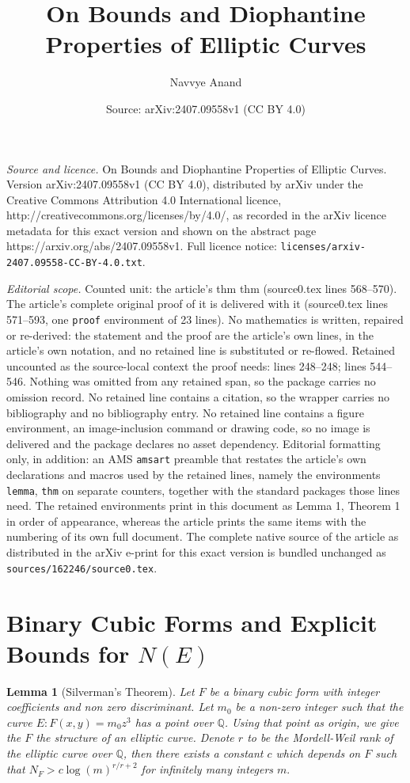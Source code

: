\documentclass[10pt,a4paper]{amsart}
\title{On Bounds and Diophantine Properties of Elliptic Curves}
\author{Navvye Anand}
\date{Source: arXiv:2407.09558v1 (CC BY 4.0)}
\newtheorem{lemma}{Lemma}
\begin{document}
\maketitle

\noindent\emph{Source and licence.} On Bounds and Diophantine Properties of Elliptic Curves. Version arXiv:2407.09558v1 (CC BY 4.0), distributed by arXiv under the Creative Commons Attribution 4.0 International licence, http://creativecommons.org/licenses/by/4.0/, as recorded in the arXiv licence metadata for this exact version and shown on the abstract page https://arxiv.org/abs/2407.09558v1. Full licence notice: \texttt{licenses/arxiv-2407.09558-CC-BY-4.0.txt}.\par\smallskip

\noindent\textit{Editorial scope.} Counted unit: the article's thm thm (source0.tex lines 568--570). The article's complete original proof of it is delivered with it (source0.tex lines 571--593, one \texttt{proof} environment of 23 lines). No mathematics is written, repaired or re-derived: the statement and the proof are the article's own lines, in the article's own notation, and no retained line is substituted or re-flowed.  Retained uncounted as the source-local context the proof needs: lines 248--248; lines 544--546.  Nothing was omitted from any retained span, so the package carries no omission record.  No retained line contains a citation, so the wrapper carries no bibliography and no bibliography entry.  No retained line contains a figure environment, an image-inclusion command or drawing code, so no image is delivered and the package declares no asset dependency.  Editorial formatting only, in addition: an AMS \texttt{amsart} preamble that restates the article's own declarations and macros used by the retained lines, namely the environments \texttt{lemma}, \texttt{thm} on separate counters, together with the standard packages those lines need.  The retained environments print in this document as Lemma 1, Theorem 1 in order of appearance, whereas the article prints the same items with the numbering of its own full document.  The complete native source of the article as distributed in the arXiv e-print for this exact version is bundled unchanged as \texttt{sources/162246/source0.tex}.
\section{Binary Cubic Forms and Explicit Bounds for $N(E)$} \label{BinaryCubic}

\begin{lemma}[{Silverman's Theorem}]\label{Silverman's Theorem}
    Let $F$ be a binary cubic form with integer coefficients and non zero discriminant. Let $m_0 $ be a non-zero integer such that the curve $E : F(x,y) = m_0 z^3$ has a point over $\mathbb{Q}$. Using that point as origin, we give the $F$ the structure of an elliptic curve. Denote $r$ to be the Mordell-Weil rank of the elliptic curve over $\mathbb{Q}$, then there exists a constant $c$ which depends on $F$ such that $N_{F} > c \log{(m)}^{r/r+2}$ for infinitely many integers $m.$
\end{lemma}
\end{document}
